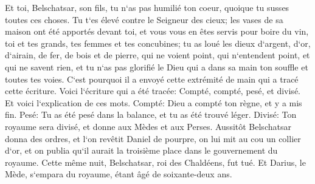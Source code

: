 \verse Et toi, Belschatsar, son fils, tu n`as pas humilié ton coeur, quoique tu susses toutes ces choses. 
\verse Tu t`es élevé contre le Seigneur des cieux; les vases de sa maison ont été apportés devant toi, et vous vous en êtes servis pour boire du vin, toi et tes grands, tes femmes et tes concubines; tu as loué les dieux d`argent, d`or, d`airain, de fer, de bois et de pierre, qui ne voient point, qui n`entendent point, et qui ne savent rien, et tu n`as pas glorifié le Dieu qui a dans sa main ton souffle et toutes tes voies. 
\verse C`est pourquoi il a envoyé cette extrémité de main qui a tracé cette écriture. 
\verse Voici l`écriture qui a été tracée: Compté, compté, pesé, et divisé. 
\verse Et voici l`explication de ces mots. Compté: Dieu a compté ton règne, et y a mis fin. 
\verse Pesé: Tu as été pesé dans la balance, et tu as été trouvé léger. 
\verse Divisé: Ton royaume sera divisé, et donne aux Mèdes et aux Perses. 
\verse Aussitôt Belschatsar donna des ordres, et l`on revêtit Daniel de pourpre, on lui mit au cou un collier d`or, et on publia qu`il aurait la troisième place dans le gouvernement du royaume. 
\verse Cette même nuit, Belschatsar, roi des Chaldéens, fut tué. 
\verse Et Darius, le Mède, s`empara du royaume, étant âgé de soixante-deux ans. 

\chapter{}

